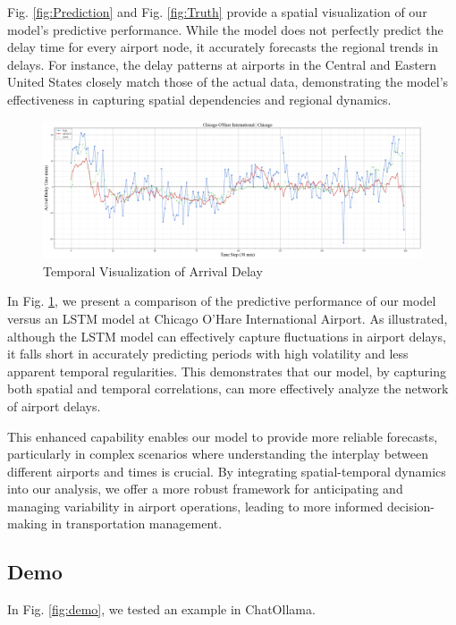 \documentclass[conference]{IEEEtran}
\begin{document}
Fig. \ref{fig:Prediction} and Fig. \ref{fig:Truth} provide a spatial visualization of our model’s predictive performance. While the model does not perfectly predict the delay time for every airport node, it accurately forecasts the regional trends in delays. For instance, the delay patterns at airports in the Central and Eastern United States closely match those of the actual data, demonstrating the model's effectiveness in capturing spatial dependencies and regional dynamics.


\begin{figure}[h!]
    \centering
    \includegraphics[width=1\linewidth]{temporal.png}
    \caption{Temporal Visualization of Arrival Delay}
    \label{fig:chi}
\end{figure}

In Fig. \ref{fig:chi}, we present a comparison of the predictive performance of our model versus an LSTM model at Chicago O'Hare International Airport. As illustrated, although the LSTM model can effectively capture fluctuations in airport delays, it falls short in accurately predicting periods with high volatility and less apparent temporal regularities. This demonstrates that our model, by capturing both spatial and temporal correlations, can more effectively analyze the network of airport delays.

This enhanced capability enables our model to provide more reliable forecasts, particularly in complex scenarios where understanding the interplay between different airports and times is crucial. By integrating spatial-temporal dynamics into our analysis, we offer a more robust framework for anticipating and managing variability in airport operations, leading to more informed decision-making in transportation management.


\subsection{Demo}

In Fig. \ref{fig:demo}, we tested an example in ChatOllama. 
\end{document}
